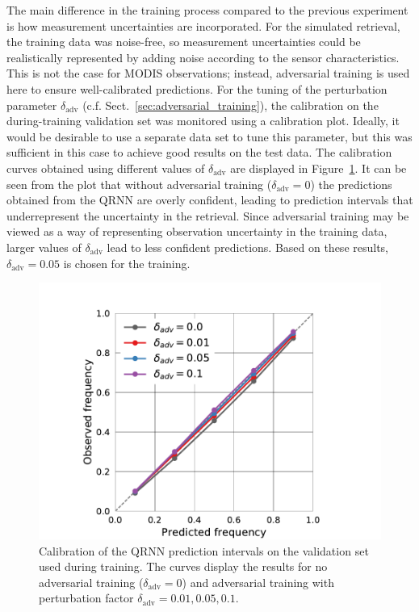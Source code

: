 \documentclass[journal abbreviation, manuscript]{copernicus}
\begin{document}
The main difference in the training process compared to the previous experiment
is how measurement uncertainties are incorporated. For the simulated retrieval,
the training data was noise-free, so measurement uncertainties could be
realistically represented by adding noise according to the sensor
characteristics. This is not the case for MODIS observations; instead,
adversarial training is used here to ensure well-calibrated predictions. For the
tuning of the perturbation parameter $\delta_{\text{adv}}$ (c.f.
Sect.~\ref{sec:adversarial_training}), the calibration on the during-training
validation set was monitored using a calibration plot. Ideally, it would be
desirable to use a separate data set to tune this parameter, but this was
sufficient in this case to achieve good results on the test data. The calibration curves
obtained using different values of $\delta_\text{adv}$ are displayed in
Figure~\ref{fig:validation_calibration}. It can be seen from the plot that
without adversarial training ($\delta_\text{adv} = 0$) the predictions obtained
from the QRNN are overly confident, leading to prediction intervals that
underrepresent the uncertainty in the retrieval. Since adversarial training may
be viewed as a way of representing observation uncertainty in the training data,
larger values of $\delta_\text{adv}$ lead to less confident predictions. Based
on these results, $\delta_\text{adv} = 0.05$ is chosen for the training.

  \begin{figure}[hbpt!]
    \centering
    \includegraphics[width = 0.6\linewidth]{../plots/fig07}
    \caption{Calibration of the QRNN prediction intervals on the validation set
      used during training. The curves display the results for no adversarial training
      ($\delta_\text{adv} = 0$) and adversarial training with perturbation
      factor $\delta_\text{adv} = 0.01, 0.05, 0.1$.}
    \label{fig:validation_calibration}
  \end{figure}
  
\end{document}

